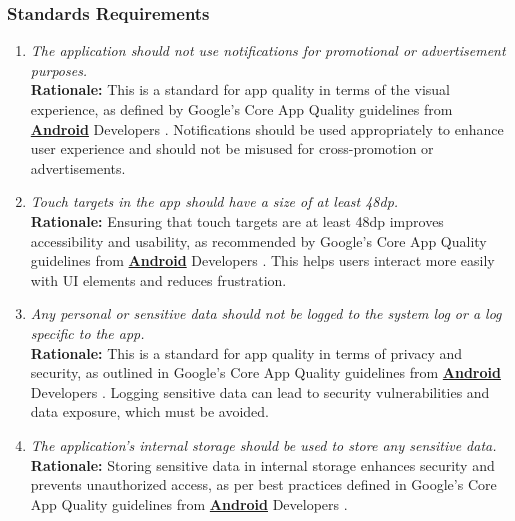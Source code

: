 \documentclass[]{article}
\begin{document}
\subsubsection{Standards Requirements}
\label{ssub:standards_requirements}
\begin{enumerate}[{LR-STD}1. ]
    \item \textit{The application should not use notifications for promotional or advertisement purposes.}
    \\ \textbf{Rationale:} This is a standard for app quality in terms of the visual experience, as defined by Google's Core App Quality guidelines from \hyperref[Android]{\textbf{Android}} Developers \cite{GoogleCoreAppQuality}. Notifications should be used appropriately to enhance user experience and should not be misused for cross-promotion or advertisements.

    \item \textit{Touch targets in the app should have a size of at least 48dp.}
    \\ \textbf{Rationale:} Ensuring that touch targets are at least 48dp improves accessibility and usability, as recommended by Google's Core App Quality guidelines from \hyperref[Android]{\textbf{Android}} Developers \cite{GoogleCoreAppQuality}. This helps users interact more easily with UI elements and reduces frustration.

    \item \textit{Any personal or sensitive data should not be logged to the system log or a log specific to the app.}
    \\ \textbf{Rationale:} This is a standard for app quality in terms of privacy and security, as outlined in Google's Core App Quality guidelines from \hyperref[Android]{\textbf{Android}} Developers \cite{GoogleCoreAppQuality}. Logging sensitive data can lead to security vulnerabilities and data exposure, which must be avoided.

    \item \textit{The application's internal storage should be used to store any sensitive data.}
    \\ \textbf{Rationale:} Storing sensitive data in internal storage enhances security and prevents unauthorized access, as per best practices defined in Google's Core App Quality guidelines from \hyperref[Android]{\textbf{Android}} Developers \cite{GoogleCoreAppQuality}.
\end{enumerate}

\end{document}
